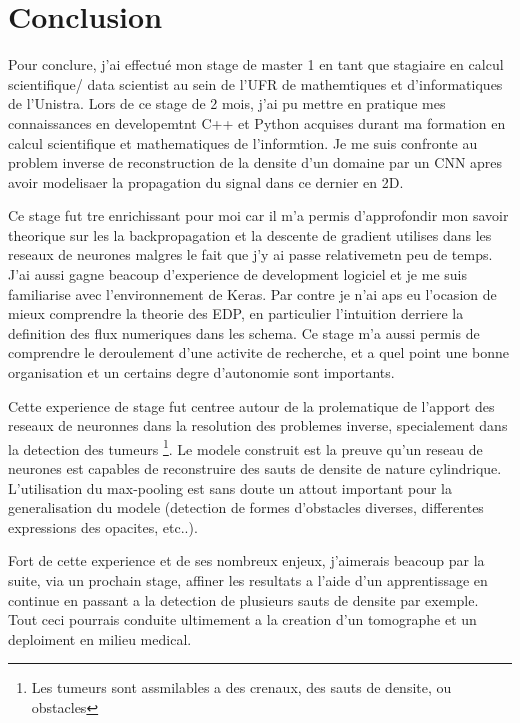 
\chapter{Conclusion} %

\label{Chapter6} %


Pour conclure, j’ai effectué mon stage de master 1 en tant que stagiaire en calcul scientifique/ data scientist au sein de l'UFR de mathemtiques et d'informatiques de l'Unistra. Lors de ce stage de 2 mois, j’ai pu mettre en pratique mes connaissances en developemtnt C++ et Python acquises durant ma formation en calcul scientifique et mathematiques de l'informtion. Je me suis confronte au problem inverse de reconstruction de la densite d'un domaine par un CNN apres avoir modelisaer la propagation du signal dans ce dernier en 2D.

Ce stage fut tre enrichissant pour moi car il m'a permis d'approfondir mon savoir theorique sur les la backpropagation et la descente de gradient utilises dans les reseaux de neurones malgres le fait que j'y ai passe relativemetn peu de temps. J'ai aussi gagne beacoup d'experience de development logiciel et je me suis familiarise avec l'environnement de Keras. Par contre je n'ai aps eu l'ocasion de mieux comprendre la theorie des EDP, en particulier l'intuition derriere la definition des flux numeriques dans les schema. Ce stage m’a aussi permis de comprendre le deroulement d'une activite de recherche, et a quel point une bonne organisation et un certains degre d'autonomie sont importants.

Cette experience de stage fut centree autour de la prolematique de l'apport des reseaux de neuronnes dans la resolution des problemes inverse, specialement dans la detection des tumeurs \footnote{Les tumeurs sont assmilables a des crenaux, des sauts de densite, ou obstacles}. Le modele construit est la preuve qu'un reseau de neurones est capables de reconstruire des sauts de densite de nature cylindrique. L'utilisation du max-pooling est sans doute un attout important pour la generalisation du modele (detection de formes d'obstacles diverses, differentes expressions des opacites, etc..).

Fort de cette experience et de ses nombreux enjeux, j'aimerais beacoup par la suite, via un prochain stage,  affiner les resultats a l'aide d'un apprentissage en continue en passant a la detection de plusieurs sauts de densite par exemple. Tout ceci pourrais conduite ultimement a la creation d'un tomographe et un deploiment en milieu medical.
